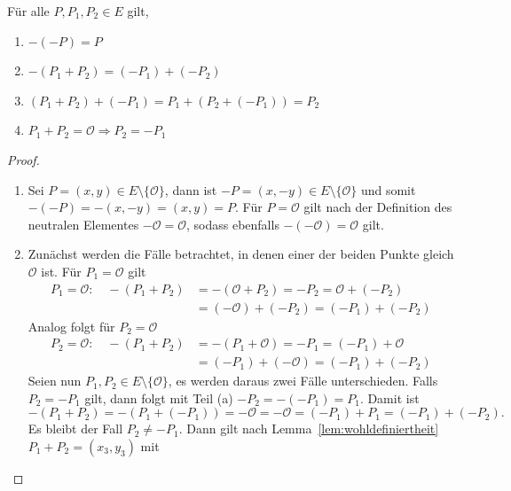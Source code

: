 \begin{lemma}\label{lem:ass-hilfseigenschaften}
    Für alle $P,P_1,P_2\in E$ gilt,
    \begin{enumerate}[label= (\alph*)]
        \item \(-(-P)=P\)
        \item $-(P_1+P_2)=(-P_1)+(-P_2)$
        \item $(P_1+P_2)+(-P_1)=P_1+(P_2+(-P_1))=P_2$
        \item $P_1+P_2=\mathcal{O} \Rightarrow P_2=-P_1$
    \end{enumerate}
\end{lemma}

\begin{proof}
    \begin{enumerate}[label= (\alph*)]
        \item Sei $P=(x,y)\in E\setminus\{\mathcal{O}\}$, dann ist $-P=(x,-y)\in E\setminus\{\mathcal{O}\}$ und somit $-(-P)=-(x,-y)=(x,y)=P$. Für $P=\mathcal{O}$ gilt nach der Definition des neutralen Elementes $-\mathcal{O}=\mathcal{O}$, sodass ebenfalls \(-(-\mathcal{O})=\mathcal{O}\) gilt.
        \item Zunächst werden die Fälle betrachtet, in denen einer der beiden
              Punkte gleich $\mathcal{O}$ ist. Für $P_1=\mathcal{O}$ gilt
              \begin{align*}
                  P_1 =\mathcal{O}: \quad -(P_1+P_2) & =-(\mathcal{O}+P_2)=-P_2=\mathcal{O}+(-P_2) \\
                                                     & = (-\mathcal{O})+(-P_2)=(-P_1)+(-P_2)
              \end{align*}
              Analog folgt für $P_2=\mathcal{O}$
              \begin{align*}
                  P_2 =\mathcal{O}: \quad -(P_1+P_2) & =-(P_1+\mathcal{O})=-P_1= (-P_1)+\mathcal{O} \\
                                                     & = (-P_1)+(-\mathcal{O})=(-P_1)+(-P_2)
              \end{align*}
              Seien nun $P_1,P_2\in E \setminus\{\mathcal{O}\}$, es werden daraus zwei Fälle unterschieden. Falls $P_2=-P_1$ gilt, dann folgt mit Teil (a) $-P_2=-(-P_1)=P_1$. Damit ist
              \[
                  -(P_1+P_2)=-(P_1+(-P_1))=-\mathcal{O}=-\mathcal{O}=(-P_1)+P_1=(-P_1)+(-P_2).
              \]
              Es bleibt der Fall \(P_2\neq -P_1\). Dann gilt nach Lemma~\ref{lem:wohldefiniertheit} $P_1+P_2=(x_3,y_3)$ mit
              \[
\]
\end{enumerate}
\end{proof}
